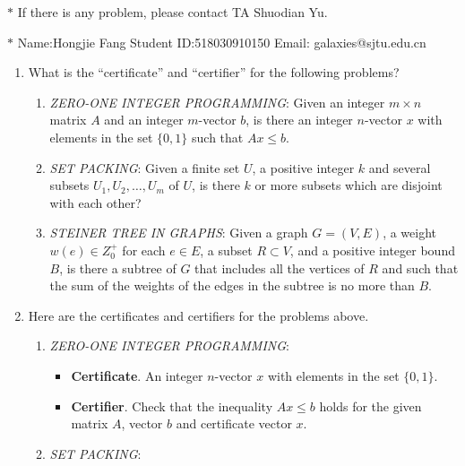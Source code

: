 \documentclass[12pt,a4paper]{article}
\makeatletter
\newtheorem*{solution}{Solution}
\theoremstyle{definition}
\renewenvironment{solution}[1][Solution] {\par\pushQED{\qed}\normalfont\topsep6\p@\@plus6\p@\relax\trivlist\item[\hskip\labelsep\bfseries#1\@addpunct{.}]\ignorespaces}{\popQED\endtrivlist\@endpefalse} \makeatother
\makeatother
\begin{document}
\noindent

\noindent{}
\begin{center}
\footnotesize{\color{red}$*$ If there is any problem, please contact TA Shuodian Yu. }

\footnotesize{\color{blue}$*$ Name:Hongjie Fang  \quad Student ID:518030910150 \quad Email: galaxies@sjtu.edu.cn}
\end{center}
\begin{enumerate}
	\item What is the ``certificate'' and ``certifier'' for the following problems?
	\begin{enumerate}
		\item \emph{ZERO-ONE INTEGER PROGRAMMING}: Given an integer $m \times n$ matrix $A$ and an integer $m$-vector $b$, is there an integer $n$-vector $x$ with elements in the set $\{0, 1\}$ such that $Ax \leq b$.
		\item \emph{SET PACKING}: Given a finite set $U$, a positive integer $k$ and several subsets $U_1, U_2, \ldots, U_m$ of $U$, is there $k$ or more subsets which are disjoint with each other?
		\item \emph{STEINER TREE IN GRAPHS}: Given a graph $G=(V,E)$, a weight $w(e)\in Z_0^{+}$ for each $e\in E$, a subset $R \subset V$, and a positive integer bound $B$, is there a subtree of $G$ that includes all the vertices of $R$ and such that the sum of the weights of the edges in the subtree is no more than $B$.
	\end{enumerate}
	\begin{solution}
        Here are the certificates and certifiers for the problems above.
        \begin{enumerate}
 		\item \emph{ZERO-ONE INTEGER PROGRAMMING}:
            \begin{itemize}
            \item \textbf{Certificate}. An integer $n$-vector $x$ with elements in the set $\{0, 1\}$.
            \item \textbf{Certifier}. Check that the inequality $Ax \leq b$ holds for the given matrix $A$, vector $b$ and certificate vector $x$.
            \end{itemize}
		\item \emph{SET PACKING}:

\end{enumerate}
\end{solution}
\end{enumerate}
\end{document}
